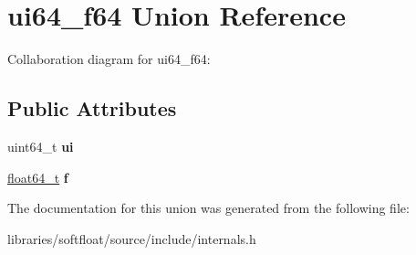 \hypertarget{unionui64__f64}{}\section{ui64\+\_\+f64 Union Reference}
\label{unionui64__f64}


Collaboration diagram for ui64\+\_\+f64\+:
\subsection*{Public Attributes}
\begin{DoxyCompactItemize}
\item 
\mbox{\label{unionui64__f64_a8f2bd2e3e69133354de3a30ec71c0634}} 
uint64\+\_\+t {\bfseries ui}
\item 
\mbox{\label{unionui64__f64_a6c3253c08850759ca3c64dd956c6b4dd}} 
\mbox{\hyperlink{structfloat64__t}{float64\+\_\+t}} {\bfseries f}
\end{DoxyCompactItemize}


The documentation for this union was generated from the following file\+:\begin{DoxyCompactItemize}
\item 
libraries/softfloat/source/include/internals.\+h\end{DoxyCompactItemize}
